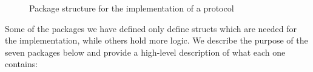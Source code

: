 \documentclass[12pt,twoside]{report}
\begin{document}
\begin{figure}[h!]
    \centering
    \begin{minipage}{5cm}
    \end{minipage}
    \caption{Package structure for the implementation of a protocol}
    \label{project-package-structure}
\end{figure}

Some of the packages we have defined only define structs which are needed for the implementation, while others hold more logic. We describe the purpose of the seven packages below and provide a high-level description of what each one contains:

\end{document}
